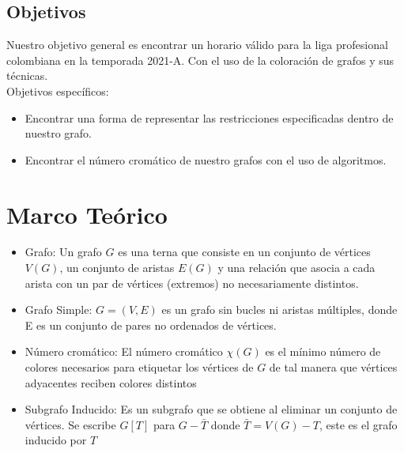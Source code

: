 \documentclass[11pt]{article}
\begin{document}
\begin{multicols}{2}
            \subsection{Objetivos}
                Nuestro objetivo general es encontrar un horario válido para la liga profesional colombiana en la temporada 2021-A. Con el uso de la coloración 
                de grafos y sus técnicas.\\[10pt]
                Objetivos específicos:
                \begin{itemize}
                    \item Encontrar una forma de representar las restricciones especificadas dentro de nuestro grafo. 
                    \item Encontrar el número cromático de nuestro grafos con el uso de algoritmos.
                \end{itemize}

        \section{Marco Teórico}

            \begin{itemize}
                \item Grafo: Un grafo $G$ es una terna que consiste en un conjunto de vértices $V(G)$, un conjunto 
                de aristas $E(G)$ y una relación que asocia a cada arista con un par de vértices (extremos) 
                no necesariamente distintos.
                \item Grafo Simple: $G = (V,E)$ es un grafo sin bucles ni aristas múltiples, donde E es un conjunto 
                de pares no ordenados de vértices.
                \item Número cromático: El número cromático $\chi(G)$ es el mínimo número de colores necesarios 
                para etiquetar los vértices de $G$ de tal manera que vértices adyacentes reciben colores 
                distintos
                \item Subgrafo Inducido: Es un subgrafo que se obtiene al eliminar un conjunto de vértices. Se 
                escribe $G[T]$ para $G-\bar{T}$ donde $\bar{T} = V(G) - T$, este es el grafo inducido por $T$                 
            \end{itemize}
        

\end{multicols}
\end{document}
